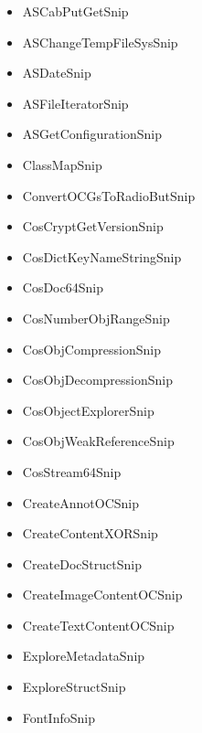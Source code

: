 \documentclass[letterpaper,12pt,english,openany,oneside]{sphinxmanual}
\begin{document}
\begin{itemize}
\item {} 
ASCabPutGetSnip

\item {} 
ASChangeTempFileSysSnip

\item {} 
ASDateSnip

\item {} 
ASFileIteratorSnip

\item {} 
ASGetConfigurationSnip

\item {} 
ClassMapSnip

\item {} 
ConvertOCGsToRadioButSnip

\item {} 
CosCryptGetVersionSnip

\item {} 
CosDictKeyNameStringSnip

\item {} 
CosDoc64Snip

\item {} 
CosNumberObjRangeSnip

\item {} 
CosObjCompressionSnip

\item {} 
CosObjDecompressionSnip

\item {} 
CosObjectExplorerSnip

\item {} 
CosObjWeakReferenceSnip

\item {} 
CosStream64Snip

\item {} 
CreateAnnotOCSnip

\item {} 
CreateContentXORSnip

\item {} 
CreateDocStructSnip

\item {} 
CreateImageContentOCSnip

\item {} 
CreateTextContentOCSnip

\item {} 
ExploreMetadataSnip

\item {} 
ExploreStructSnip

\item {} 
FontInfoSnip


\end{itemize}
\end{document}
